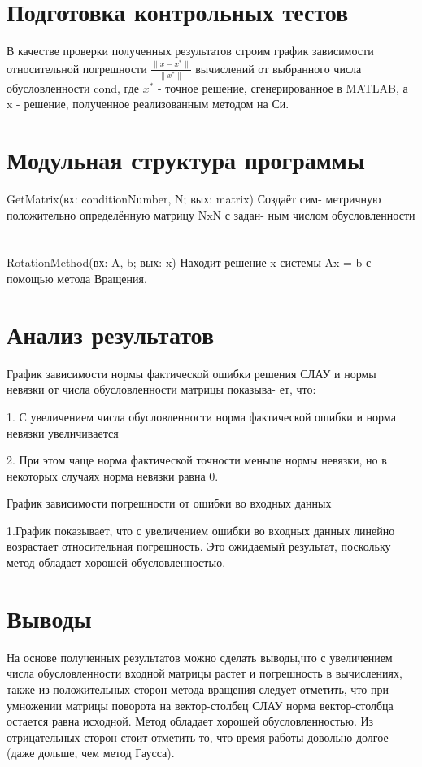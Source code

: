 \documentclass{article}
\begin{document}
	\section{Подготовка контрольных тестов}
	 В качестве проверки полученных результатов строим график зависимости относительной погрешности $\frac{\|x -x^*\|}{\|x^*\|}$  вычислений от выбранного числа обусловленности cond, где $x^*$ - точное решение, сгенерированное в MATLAB, а x - решение,
	полученное реализованным методом на Си.
	
	\section{Модульная структура программы}
	GetMatrix(вх: conditionNumber, N; вых: matrix) Создаёт сим-
	метричную положительно определённую матрицу NxN с задан-
	ным числом обусловленности
	~\\
	~\\
	RotationMethod(вх: A, b; вых: x) Находит решение x системы
	Ax = b с помощью метода Вращения.
	
	\section{Анализ результатов}
	График зависимости нормы фактической ошибки решения СЛАУ
	и нормы невязки от числа обусловленности матрицы показыва-
	ет, что:
	
	1. С увеличением числа обусловленности норма фактической
	ошибки и норма невязки увеличивается
	
	2. При этом чаще норма фактической точности меньше нормы
	невязки, но в некоторых случаях норма невязки равна 0.
	
	График зависимости погрешности от ошибки во входных данных
	
	1.График показывает, что с увеличением ошибки во входных данных линейно возрастает относительная погрешность. Это ожидаемый результат, поскольку метод обладает хорошей обусловленностью.
	\section{Выводы}
	На основе полученных результатов можно сделать выводы,что с увеличением числа обусловленности входной матрицы растет и погрешность в вычислениях, также из положительных сторон метода вращения следует отметить, что при умножении матрицы поворота на вектор-столбец СЛАУ норма вектор-столбца остается равна исходной. Метод обладает хорошей обусловленностью. Из отрицательных сторон стоит отметить то, что время работы довольно долгое (даже дольше, чем метод Гаусса).
	
\end{document}
